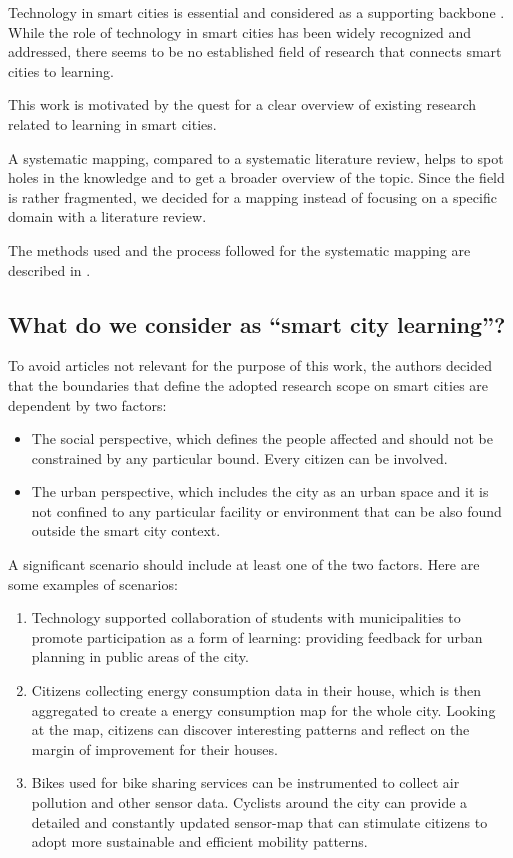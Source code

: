 Technology in smart cities is essential and considered as a supporting backbone \cite{giovannella_smart_2014}.
While the role of technology in smart cities has been widely recognized and addressed, there seems to be no established field of research that connects smart cities to learning.

This work is motivated by the quest for a clear overview of existing research related to learning in smart cities.

A systematic mapping, compared to a systematic literature review, helps to spot holes in the knowledge and to get a broader overview of the topic. Since the field is rather fragmented, we decided for a mapping instead of focusing on a specific domain with a literature review.

The methods used and the process followed for the systematic mapping are described in \cite{petersen_systematic_2008}.


\subsection{What do we consider as ``smart city learning''?} \label{subsec:definition}

To avoid articles not relevant for the purpose of this work, the authors decided that the boundaries that define the adopted research scope on smart cities are dependent by two factors:

\begin{itemize}
\item The social perspective, which defines the people affected and should not be constrained by any particular bound. Every citizen can be involved.
\item The urban perspective, which includes the city as an urban space and it is not confined to any particular facility or environment that can be also found outside the smart city context.
\end{itemize}

A significant scenario should include at least one of the two factors. Here are some examples of scenarios:

\begin{enumerate}
\item Technology supported collaboration of students with municipalities to promote participation as a form of learning: providing feedback for urban planning in public areas of the city.
\item Citizens collecting energy consumption data in their house, which is then aggregated to create a energy consumption map for the whole city. Looking at the map, citizens can discover interesting patterns and reflect on the margin of improvement for their houses.
\item Bikes used for bike sharing services can be instrumented to collect air pollution and other sensor data. Cyclists around the city can provide a detailed and constantly updated sensor-map that can stimulate citizens to adopt more sustainable and efficient mobility patterns.
\end{enumerate}

